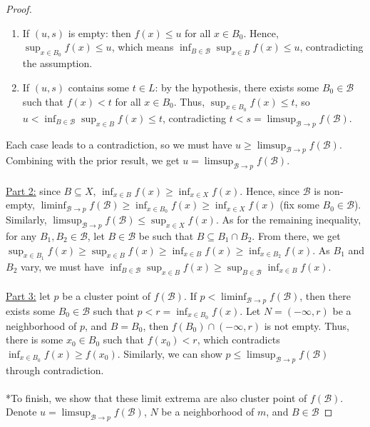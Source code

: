 \documentclass{treatise}
\begin{document}
\begin{proof}
\begin{enumerate}
    \item If $(u, s)$ is empty: then $f(x) \leq u$ for all $x \in B_0$. Hence, $\sup_{x \in B_0} f(x) \leq u$, which means $\inf_{B \in \mathcal{B}} \sup_{x \in B} f(x) \leq u$, contradicting the assumption.
    \item If $(u, s)$ contains some $t \in L$: by the hypothesis, there exists some $B_0 \in \mathcal{B}$ such that $f(x) < t$ for all $x \in B_0$. Thus, $\sup_{x \in B_0} f(x) \leq t$, so $u < \inf_{B \in \mathcal{B}} \sup_{x \in B} f(x) \leq t$, contradicting $t < s = \limsup_{\mathcal{B} \to p} f(\mathcal{B})$.
\end{enumerate}
Each case leads to a contradiction, so we must have $u \geq \limsup_{\mathcal{B} \to p} f(\mathcal{B})$. Combining with the prior result, we get $u = \limsup_{\mathcal{B} \to p} f(\mathcal{B})$.
\\
\\
\underline{Part 2:} since $B \subseteq X$, $\inf_{x \in B} f(x) \geq \inf_{x \in X} f(x)$. Hence, since $\mathcal{B}$ is non-empty, $\liminf_{\mathcal{B} \to p} f(\mathcal{B}) \geq \inf_{x \in B_0} f(x) \geq \inf_{x \in X} f(x)$ (fix some $B_0 \in \mathcal{B}$). Similarly, $\limsup_{\mathcal{B} \to p} f(\mathcal{B}) \leq \sup_{x \in X} f(x)$. As for the remaining inequality, for any $B_1, B_2 \in \mathcal{B}$, let $B \in \mathcal{B}$ be such that $B \subseteq B_1 \cap B_2$. From there, we get $\sup_{x \in B_1} f(x) \geq \sup_{x \in B} f(x) \geq \inf_{x \in B} f(x) \geq \inf_{x \in B_2} f(x)$. As $B_1$ and $B_2$ vary, we must have $\inf_{B \in \mathcal{B}} \sup_{x \in B} f(x) \geq \sup_{B \in \mathcal{B}} \inf_{x \in B} f(x)$.
\\
\\
\underline{Part 3:} let $p$ be a cluster point of $f(\mathcal{B})$. If $p < \liminf_{\mathcal{B} \to p} f(\mathcal{B})$, then there exists some $B_0 \in \mathcal{B}$ such that $p < r = \inf_{x \in B_0} f(x)$. Let $N = (-\infty, r)$ be a neighborhood of $p$, and $B = B_0$, then $f(B_0) \cap (-\infty, r)$ is not empty. Thus, there is some $x_0 \in B_0$ such that $f(x_0) < r$, which contradicts $\inf_{x \in B_0} f(x) \geq f(x_0)$. Similarly, we can show $p \leq \limsup_{\mathcal{B} \to p} f(\mathcal{B})$ through contradiction.
\\
\\
*To finish, we show that these limit extrema are also cluster point of $f(\mathcal{B})$. Denote $u = \limsup_{\mathcal{B} \to p} f(\mathcal{B})$, $N$ be a neighborhood of $m$, and $B \in \mathcal{B}$

\end{proof}
\end{document}
